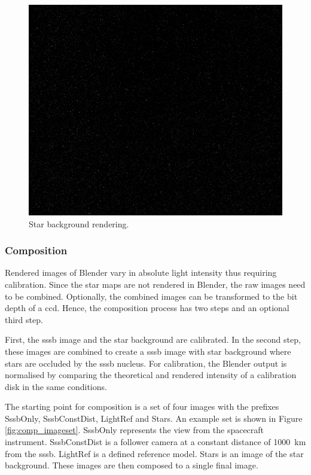 \begin{figure}[htb]
    \centering
    \includegraphics[width=\textwidth]{doc/thesis/0_figures/star_rendering/Stars_2017-08-15T115856-171000.png}
    \caption{Star background rendering.}
    \label{fig:star_rendering}
\end{figure}

\subsubsection{Composition} \label{sec:composition}
Rendered images of Blender vary in absolute light intensity thus requiring calibration. Since the star maps are not rendered in Blender, the raw images need to be combined. Optionally, the combined images can be transformed to the bit depth of a \gls{ccd}. Hence, the composition process has two steps and an optional third step. 

First, the \gls{sssb} image and the star background are calibrated. In the second step, these images are combined to create a \gls{sssb} image with star background where stars are occluded by the \gls{sssb} nucleus. For calibration, the Blender output is normalised by comparing the theoretical and rendered intensity of a calibration disk in the same conditions.

The starting point for composition is a set of four images with the prefixes SssbOnly, SssbConstDist, LightRef and Stars. An example set is shown in Figure \ref{fig:comp_imageset}. SssbOnly represents the view from the spacecraft instrument. SssbConstDist is a follower camera at a constant distance of \SI{1000}{\kilo\meter} from the \gls{sssb}. LightRef is a defined reference model. Stars is an image of the star background. These images are then composed to a single final image.


